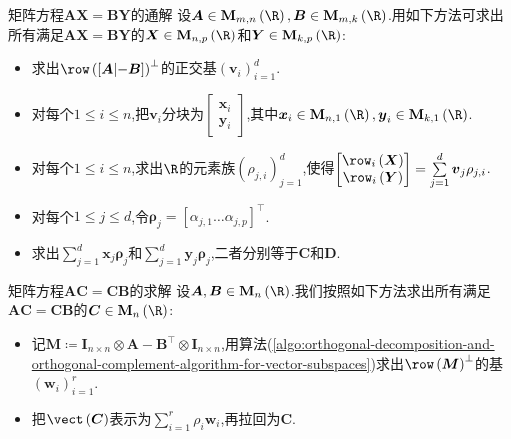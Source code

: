 \begin{example}{矩阵方程$\boldsymbol{A}\boldsymbol{X}=\boldsymbol{B}\boldsymbol{Y}$的通解}{}
	设$\boldsymbol{A}\in\mathbf{M}_{m,n}\left(\R\right),\boldsymbol{B}\in\mathbf{M}_{m,k}\left(\R\right)$.用如下方法可求出所有满足$\boldsymbol{A}\boldsymbol{X}=\boldsymbol{B}\boldsymbol{Y}$的$\boldsymbol{X}\in\mathbf{M}_{n,p}\left(\R\right)$和$\boldsymbol{Y}\in\mathbf{M}_{k,p}\left(\R\right)$:
	\begin{itemize}
		\item 求出$\row\left(\left[\boldsymbol{A}\middle|-\boldsymbol{B}\right]\right)^{\perp}$的正交基$\left(\boldsymbol{v}_{i}\right)_{i=1}^{d}$.
		\item 对每个$1\leq i\leq n$,把$\boldsymbol{v}_{i}$分块为$
		\begin{bmatrix}
			\boldsymbol{x}_{i}\\
			\boldsymbol{y}_{i}
		\end{bmatrix}$,其中$\boldsymbol{x}_{i}\in\mathbf{M}_{n,1}\left(\R\right),\boldsymbol{y}_{i}\in\mathbf{M}_{k,1}\left(\R\right)$.
		\item 对每个$1\leq i\leq n$,求出$\R$的元素族$\left(\rho_{j,i}\right)_{j=1}^{d}$,使得$
		\begin{bmatrix}
			\row_{i}\left(\boldsymbol{X}\right)\\
			\row_{i}\left(\boldsymbol{Y}\right)
		\end{bmatrix}=\sum\limits_{j=1}^{d}\boldsymbol{v}_{j}\rho_{j,i}$.
		\item 对每个$1\leq j\le d$,令$\boldsymbol{\rho}_{j}=\left[\alpha_{j,1}\ldots\alpha_{j,p}\right]^{\top}$.
		\item 求出$\sum\limits_{j=1}^{d}\boldsymbol{x}_{j}\boldsymbol{\rho}_{j}$和$\sum\limits_{j=1}^{d}\boldsymbol{y}_{j}\boldsymbol{\rho}_{j}$,二者分别等于$\boldsymbol{C}$和$\boldsymbol{D}$.
	\end{itemize}
\end{example}

\begin{example}{矩阵方程$\boldsymbol{A}\boldsymbol{C}=\boldsymbol{C}\boldsymbol{B}$的求解}{}
	设$\boldsymbol{A},\boldsymbol{B}\in\mathbf{M}_{n}\left(\R\right)$.我们按照如下方法求出所有满足$\boldsymbol{A}\boldsymbol{C}=\boldsymbol{C}\boldsymbol{B}$的$\boldsymbol{C}\in\mathbf{M}_{n}\left(\R\right)$:
	\begin{itemize}
		\item 记$\boldsymbol{M}\coloneq\boldsymbol{I}_{n\times n}\otimes\boldsymbol{A}-\boldsymbol{B}^{\top}\otimes\boldsymbol{I}_{n\times n}$,用算法(\ref{algo:orthogonal-decomposition-and-orthogonal-complement-algorithm-for-vector-subspaces})求出$\row\left(\boldsymbol{M}\right)^{\perp}$的基$\left(\boldsymbol{w}_{i}\right)_{i=1}^{r}$.
		\item 把$\vect\left(\boldsymbol{C}\right)$表示为$\sum\limits_{i=1}^{r}\rho_{i}\boldsymbol{w}_{i}$,再拉回为$\boldsymbol{C}$.
	\end{itemize}
\end{example}



